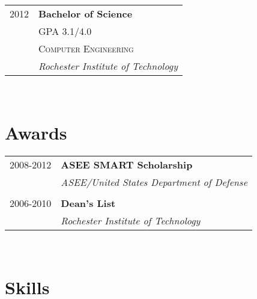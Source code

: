 \documentclass[10pt]{article} %
\begin{document}
{\begin{minipage}[t]{0.44\textwidth}
\begin{tabular}{rl}

2012 & \textbf{Bachelor of Science} \\ 
& \small GPA 3.1/4.0 \\
& \textsc{Computer Engineering} \\ 
& \textit{Rochester Institute of Technology}\\
	

\end{tabular}\\[10pt]


\section{Awards} 

\begin{tabular}{rl}
2008-2012	 & \textbf{ASEE SMART Scholarship}\\
& \textit{ASEE/United States Department of Defense}\\ \\


2006-2010	 & \textbf{Dean's List}\\
& \textit{Rochester Institute of Technology}
\end{tabular}\\[10pt]


\section{Skills} 


\end{minipage}}
\end{document}
